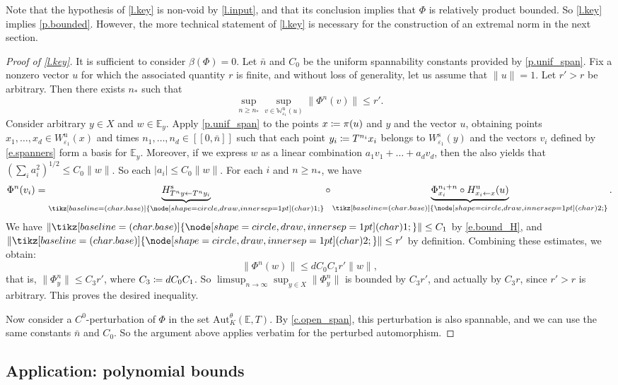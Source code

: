\documentclass[JEP,XML,SOM,Unicode]{cedram}
\newcommand{\ldbrack}{[\![}
\newcommand{\rdbrack}{]\!]}
\def\vcentcolon{\mathrel{\mathop\ordinarycolon}}
\providecommand\ordinarycolon{:}
\providecommand*\coloneqq{\vcentcolon\mathrel{\mkern-1.2mu}=}
\theoremstyle{plain}
\theoremstyle{definition}
\newcommand{\EE}{\mathbb{E}}
\newcommand{\WW}{\mathbb{W}}
\newcommand*\circled[1]{\tikz[baseline=(char.base)]{
\node[shape=circle,draw,inner sep=1pt] (char) {\footnotesize{#1}};}}
\newcommand{\uu}{\mathrm{u}}
\renewcommand{\ss}{\mathrm{s}}
\newcommand{\Aut}{\mathrm{Aut}}
\let\epsilon\varepsilon
\begin{document}
Note that the hypothesis of \cref{l.key} is non-void by \cref{l.input}, and that its conclusion implies that $\Phi$ is relatively product bounded. So \cref{l.key} implies \cref{p.bounded}. However, the more technical statement of \cref{l.key} is necessary for the construction of an extremal norm in the next section.

\begin{proof}[Proof of \cref{l.key}]
It is sufficient to consider $\beta(\Phi)=0$.
Let $\bar{n}$ and $C_0$ be the uniform spannability constants provided by \cref{p.unif_span}.
Fix a nonzero vector $u$ for which the associated quantity $r$ is finite, and without loss of generality, let us assume that $\|u\| = 1$.
Let $r'>r$ be arbitrary.
Then there exists $n_*$ such that
\[
\sup_{n \ge n_*} \sup_{v \in \WW^\uu_{\epsilon_1}(u)} \|\Phi^n(v)\| \le r'.
\]
Consider arbitrary $y \in X$ and $w \in \EE_y$.
Apply \cref{p.unif_span} to the points $x \coloneqq \pi(u)$ and $y$ and the vector $u$, obtaining
points $x_1, \dots, x_d \in W^\uu_{\epsilon_1}(x)$ and times $n_1, \dots, n_d \in \ldbrack 0, \bar{n} \rdbrack$ such that each point $y_i \coloneqq T^{n_i} x_i$ belongs to $W^\ss_{\epsilon_1}(y)$ and the vectors $v_i$ defined by \eqref{e.spanners} form a basis for $\EE_y$.
Moreover, if we express $w$ as a linear combination $a_1 v_1 + \dots + a_d v_d$, then the  also yields that $(\sum_i a_i^2)^{1/2} \le C_0 \|w\|$. So each $|a_i| \le C_0\|w\|$.
For each $i$ and $n \ge n_*$,
we have
\[
\Phi^n(v_i) = \underbrace{H^\ss_{T^n y \gets T^n y_i}}_{\circled{1}} \circ \underbrace{\Phi^{n_i+n}_{x_i} \circ H^\uu_{x_i \gets x} (u)}_{\circled{2}}.
\]
We have $\| \circled{1} \| \le C_1$ by \eqref{e.bound_H}, and $\| \circled{2} \| \le r'$ by definition.
Combining these estimates, we obtain:
\[
\|\Phi^n(w) \| \le d C_0 C_1 r' \|w\|,
\]
that is, $\|\Phi^n_y\| \le C_3 r'$, where $C_3 \coloneqq d C_0 C_1$.
So $\limsup_{n \to \infty} \sup_{y \in X} \|\Phi^n_y \|$ is bounded by $C_3 r'$,
and actually by $C_3 r$, since $r'>r$ is arbitrary.
This proves the desired inequality.

Now consider a $C^0$-perturbation of $\Phi$ in the set $\Aut^\theta_K(\EE,T)$. By \cref{c.open_span}, this perturbation is also spannable, and we can use the same constants $\bar{n}$ and $C_0$.
So the argument above applies verbatim for the perturbed automorphism.
\end{proof}

\subsection{Application: polynomial bounds}\label{ss.polynomial}
\end{document}
